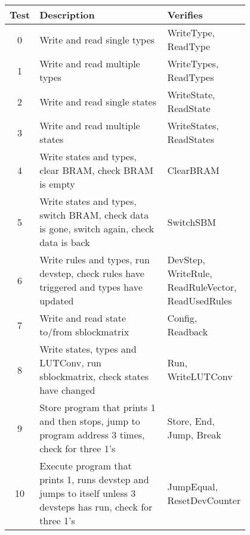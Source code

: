 \begin{table}[!ht]
    \renewcommand{\arraystretch}{1.4}
    \centering
    \begin{tabular}{c|p{0.55\linewidth}|p{0.25\linewidth}}
        \bfseries Test & \bfseries Description & \bfseries Verifies \\
        \hline
        0 & Write and read single types & WriteType, ReadType \\
        1 & Write and read multiple types & WriteTypes, ReadTypes \\
        2 & Write and read single states & WriteState, ReadState \\
        3 & Write and read multiple states & WriteStates, ReadStates \\
        4 & Write states and types, clear BRAM, check BRAM is empty & ClearBRAM \\
        5 & Write states and types, switch BRAM, check data is gone, switch again, check data is back & SwitchSBM \\
        6 & Write rules and types, run devstep, check rules have triggered and types have updated & DevStep, WriteRule, ReadRuleVector, ReadUsedRules \\
        7 & Write and read state to/from sblockmatrix & Config, Readback \\
        8 & Write states, types and LUTConv, run sblockmatrix, check states have changed & Run, WriteLUTConv \\
        9 & Store program that prints 1 and then stops, jump to program address 3 times, check for three 1's & Store, End, Jump, Break \\
        10 & Execute program that prints 1, runs devstep and jumps to itself unless 3 devsteps has run, check for three 1's & JumpEqual, ResetDevCounter \\
    \end{tabular}
\end{table}

